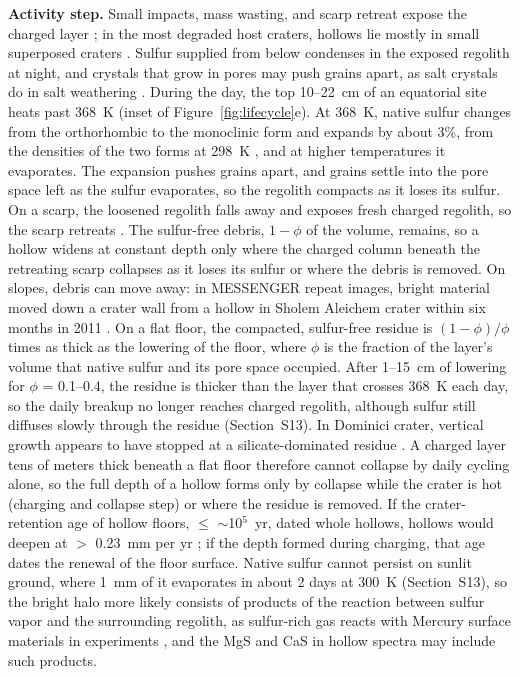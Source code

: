 \documentclass[article,review]{planetary}
\begin{document}
\textbf{Activity step.} Small impacts, mass wasting, and scarp retreat expose the charged layer \parencite{blewett2016,wright2020,speyerer2022,deutsch2025}; in the most degraded host craters, hollows lie mostly in small superposed craters \parencite{giroud2024}. Sulfur supplied from below condenses in the exposed regolith at night, and crystals that grow in pores may push grains apart, as salt crystals do in salt weathering \parencite{scherer2004,melosh2011}. During the day, the top 10--22~cm of an equatorial site heats past 368~K (inset of Figure~\ref{fig:lifecycle}e). At 368~K, native sulfur changes from the orthorhombic to the monoclinic form and expands by about 3\%, from the densities of the two forms at 298~K \parencite{steudel2003}, and at higher temperatures it evaporates. The expansion pushes grains apart, and grains settle into the pore space left as the sulfur evaporates, so the regolith compacts as it loses its sulfur. On a scarp, the loosened regolith falls away and exposes fresh charged regolith, so the scarp retreats \parencite{blewett2016}. The sulfur-free debris, $1-\phi$ of the volume, remains, so a hollow widens at constant depth only where the charged column beneath the retreating scarp collapses as it loses its sulfur or where the debris is removed. On slopes, debris can move away: in MESSENGER repeat images, bright material moved down a crater wall from a hollow in Sholem Aleichem crater within six months in 2011 \parencite{speyerer2022}. On a flat floor, the compacted, sulfur-free residue is $(1-\phi)/\phi$ times as thick as the lowering of the floor, where $\phi$ is the fraction of the layer's volume that native sulfur and its pore space occupied. After 1--15~cm of lowering for $\phi$ = 0.1--0.4, the residue is thicker than the layer that crosses 368~K each day, so the daily breakup no longer reaches charged regolith, although sulfur still diffuses slowly through the residue (Section~S13). In Dominici crater, vertical growth appears to have stopped at a silicate-dominated residue \parencite{emran2025}. A charged layer tens of meters thick beneath a flat floor therefore cannot collapse by daily cycling alone, so the full depth of a hollow forms only by collapse while the crater is hot (charging and collapse step) or where the residue is removed. If the crater-retention age of hollow floors, $\leq$ $\sim$10$^5$~yr, dated whole hollows, hollows would deepen at $>$ 0.23~mm per yr \parencite{wang2020}; if the depth formed during charging, that age dates the renewal of the floor surface. Native sulfur cannot persist on sunlit ground, where 1~mm of it evaporates in about 2 days at 300~K (Section~S13), so the bright halo more likely consists of products of the reaction between sulfur vapor and the surrounding regolith, as sulfur-rich gas reacts with Mercury surface materials in experiments \parencite{renggli2022}, and the MgS and CaS in hollow spectra \parencite{vilas2016,emran2025} may include such products.
\end{document}

